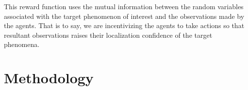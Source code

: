 \documentclass[letterpaper, 10 pt, conference]{IEEEConference}
\begin{document}


This reward function uses the mutual information between the random variables associated with the target phenomenon of interest and the observations made by the agents. That is to say, we are incentivizing the agents to take actions so that resultant observations raises their localization confidence of the target phenomena. 

\section{Methodology} \label{Methodology}

\end{document}
